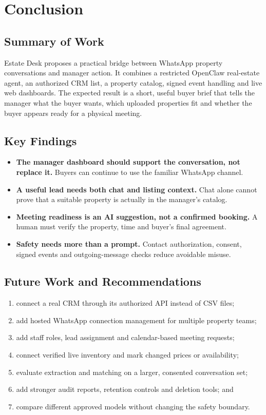 \documentclass{tietreport}
\begin{document}
\chapter{Conclusion}

\section{Summary of Work}

Estate Desk proposes a practical bridge between WhatsApp property conversations
and manager action. It combines a restricted OpenClaw real-estate agent, an
authorized CRM list, a property catalog, signed event handling and live web
dashboards. The expected result is a short, useful buyer brief that tells the
manager what the buyer wants, which uploaded properties fit and whether the
buyer appears ready for a physical meeting.

\section{Key Findings}

\begin{itemize}
  \item \textbf{The manager dashboard should support the conversation, not
    replace it.} Buyers can continue to use the familiar WhatsApp channel.
  \item \textbf{A useful lead needs both chat and listing context.} Chat alone
    cannot prove that a suitable property is actually in the manager's catalog.
  \item \textbf{Meeting readiness is an AI suggestion, not a confirmed booking.}
    A human must verify the property, time and buyer's final agreement.
  \item \textbf{Safety needs more than a prompt.} Contact authorization, consent,
    signed events and outgoing-message checks reduce avoidable misuse.
\end{itemize}

\section{Future Work and Recommendations}

\begin{enumerate}
  \item connect a real CRM through its authorized API instead of CSV files;
  \item add hosted WhatsApp connection management for multiple property teams;
  \item add staff roles, lead assignment and calendar-based meeting requests;
  \item connect verified live inventory and mark changed prices or availability;
  \item evaluate extraction and matching on a larger, consented conversation set;
  \item add stronger audit reports, retention controls and deletion tools; and
  \item compare different approved models without changing the safety boundary.
\end{enumerate}
\end{document}

